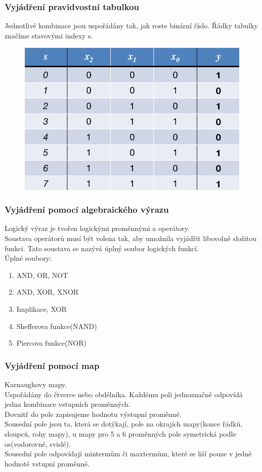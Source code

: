 \subsubsection*{Vyjádření pravidvostní tabulkou}
Jednotlivé kombinace jsou uspořádány tak, jak roste binární číslo. Řádky tabulky značíme stavovými indexy s.
\begin{figure}
    \centering
    \includegraphics[scale = 0.4]{img/PravTabulka.png}
\end{figure}

\subsubsection*{Vyjádření pomocí algebraického výrazu}
Logický výraz je tvořen logickými proměnnými a operátory.\\
Soustava operátorů musí být volena tak, aby umožnila vyjádřit libovolně složitou funkci. Tato soustava se nazývá úplný soubor logických funkcí. \\
Úplné soubory:
\begin{enumerate}
    \item AND, OR, NOT
    \item AND, XOR, XNOR
    \item Implikace, XOR
    \item Shefferova funkce(NAND)
    \item Piercova funkce(NOR)
\end{enumerate}

\subsubsection*{Vyjádření pomocí map}
Karnaughovy mapy.\\
Uspořádány do čtverce nebo obdélníka. Každému poli jednoznačně odpovídá jedna kombinace vstupních proměnných. \\
Dovnitř do pole zapisujeme hodnotu výstupní proměnné.\\
Sousední pole jsou ta, která se dotýkají, pole na okrajích mapy(konce řádků, sloupců, rohy mapy), u mapy pro 5 a 6 proměnných pole symetrická podle os(vodorovné, svislé).\\
Sousední pole odpovídají mintermům či maxtermům, které se liší pouze v jedné hodnotě vstupní proměnné.\\
